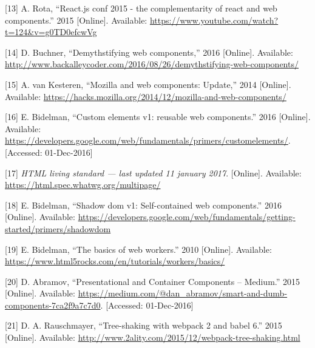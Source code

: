 \documentclass[]{article}
\begin{document}
\hypertarget{ref-Rota2015}{}
{[}13{]} A. Rota, ``React.js conf 2015 - the complementarity of react
and web components.'' 2015 {[}Online{]}. Available:
\url{https://www.youtube.com/watch?t=124\&v=g0TD0efcwVg}

\hypertarget{ref-Buchner2016}{}
{[}14{]} D. Buchner, ``Demythstifying web components,'' 2016
{[}Online{]}. Available:
\url{http://www.backalleycoder.com/2016/08/26/demythstifying-web-components/}

\hypertarget{ref-vanKesteren2014}{}
{[}15{]} A. van Kesteren, ``Mozilla and web components: Update,'' 2014
{[}Online{]}. Available:
\url{https://hacks.mozilla.org/2014/12/mozilla-and-web-components/}

\hypertarget{ref-Bidelman2016}{}
{[}16{]} E. Bidelman, ``Custom elements v1: reusable web components.''
2016 {[}Online{]}. Available:
\url{https://developers.google.com/web/fundamentals/primers/customelements/}.
{[}Accessed: 01-Dec-2016{]}

\hypertarget{ref-HTML}{}
{[}17{]} \emph{HTML living standard --- last updated 11 january 2017}.
{[}Online{]}. Available: \url{https://html.spec.whatwg.org/multipage/}

\hypertarget{ref-Bidelman2016shadow}{}
{[}18{]} E. Bidelman, ``Shadow dom v1: Self-contained web components.''
2016 {[}Online{]}. Available:
\url{https://developers.google.com/web/fundamentals/getting-started/primers/shadowdom}

\hypertarget{ref-Bidelman2010}{}
{[}19{]} E. Bidelman, ``The basics of web workers.'' 2010 {[}Online{]}.
Available: \url{https://www.html5rocks.com/en/tutorials/workers/basics/}

\hypertarget{ref-Abramov2015}{}
{[}20{]} D. Abramov, ``Presentational and Container Components --
Medium.'' 2015 {[}Online{]}. Available:
\url{https://medium.com/@dan_abramov/smart-and-dumb-components-7ca2f9a7c7d0}.
{[}Accessed: 01-Dec-2016{]}

\hypertarget{ref-Rauschmayer2015}{}
{[}21{]} D. A. Rauschmayer, ``Tree-shaking with webpack 2 and babel 6.''
2015 {[}Online{]}. Available:
\url{http://www.2ality.com/2015/12/webpack-tree-shaking.html}
\end{document}
